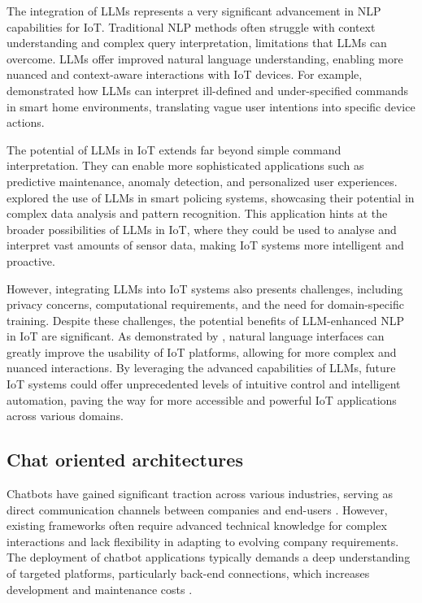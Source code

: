 \documentclass{ieeeaccess}
\begin{document}
The integration of LLMs represents a very significant advancement in NLP capabilities for IoT. Traditional NLP methods often struggle with context understanding and complex query interpretation, limitations that LLMs can overcome. LLMs offer improved natural language understanding, enabling more nuanced and context-aware interactions with IoT devices. For example, \citet{10.1145/3643505} demonstrated how LLMs can interpret ill-defined and under-specified commands in smart home environments, translating vague user intentions into specific device actions.

The potential of LLMs in IoT extends far beyond simple command interpretation. They can enable more sophisticated applications such as predictive maintenance, anomaly detection, and personalized user experiences. \citet{10538107} explored the use of LLMs in smart policing systems, showcasing their potential in complex data analysis and pattern recognition. This application hints at the broader possibilities of LLMs in IoT, where they could be used to analyse and interpret vast amounts of sensor data, making IoT systems more intelligent and proactive.

However, integrating LLMs into IoT systems also presents challenges, including privacy concerns, computational requirements, and the need for domain-specific training. Despite these challenges, the potential benefits of LLM-enhanced NLP in IoT are significant. As demonstrated by \citet{9808139}, natural language interfaces can greatly improve the usability of IoT platforms, allowing for more complex and nuanced interactions. By leveraging the advanced capabilities of LLMs, future IoT systems could offer unprecedented levels of intuitive control and intelligent automation, paving the way for more accessible and powerful IoT applications across various domains.

\subsection{Chat oriented architectures}
Chatbots have gained significant traction across various industries, serving as direct communication channels between companies and end-users \cite{8960373}. However, existing frameworks often require advanced technical knowledge for complex interactions and lack flexibility in adapting to evolving company requirements. The deployment of chatbot applications typically demands a deep understanding of targeted platforms, particularly back-end connections, which increases development and maintenance costs \cite{8960373}.
\end{document}
